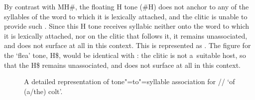{{{{{\begin{figure}[p]
	\label{fig:tonereassociationMHclitic}
\end{figure}

By contrast with MH\#, the floating H tone (\#H) does not anchor to any of the syllables of the word to which it is lexically attached, and the  clitic is unable to provide such . Since this H tone receives syllabic  neither onto the word to which it is lexically attached, nor on the  clitic that follows it, it remains unassociated, and does not surface at all in this context. This is represented as . The figure for the ‘flea' tone, H\$, would be identical with : the  clitic is not a~suitable host, so that the H\$ remains unassociated, and does not surface at all in this context. 


\begin{figure}[p]
	\caption[{A detailed representation of tone"=to"=syllable association for ‘of (a/the) colt'.}]{A detailed representation of tone"=to"=syllable association for // ‘of \mbox{(a/the)} colt'.}
\end{figure}}}}}}
